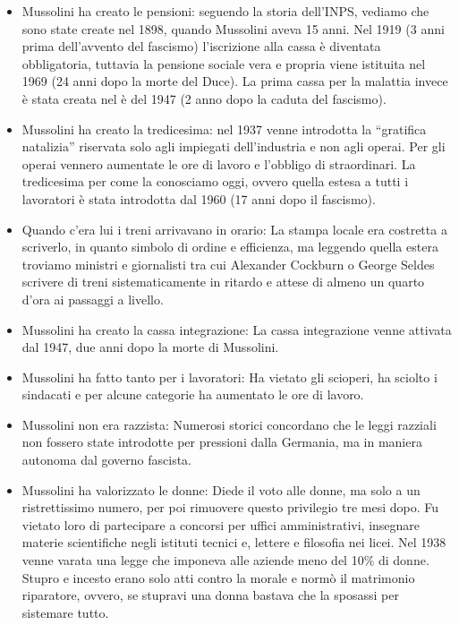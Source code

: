 \documentclass[12pt]{book} %
\begin{document}
\begin{itemize}
\item Mussolini ha creato le pensioni: seguendo la storia dell'INPS, vediamo che sono state create nel 1898, quando Mussolini aveva 15 anni. Nel 1919 (3 anni prima dell'avvento del fascismo) l'iscrizione alla cassa è diventata obbligatoria, tuttavia la pensione sociale vera e propria viene istituita nel 1969 (24 anni dopo la morte del Duce).
La prima cassa per la malattia invece è stata creata nel è del 1947 (2 anno dopo la caduta del fascismo).
\item Mussolini ha creato la tredicesima: nel 1937 venne introdotta la “gratifica natalizia” riservata solo agli impiegati dell'industria e non agli operai. Per gli operai vennero aumentate le ore di lavoro e l'obbligo di straordinari. La tredicesima per come la conosciamo oggi, ovvero quella
estesa a tutti i lavoratori è stata introdotta dal 1960 (17 anni dopo il fascismo).
\item Quando c'era lui i treni arrivavano in orario: La stampa locale era costretta a scriverlo, in quanto simbolo di ordine e efficienza, ma leggendo quella estera troviamo ministri e giornalisti tra cui Alexander Cockburn o George Seldes scrivere di treni sistematicamente in ritardo e attese di almeno un quarto d'ora ai passaggi a livello.
\item Mussolini ha creato la cassa integrazione: La cassa integrazione venne attivata dal 1947, due anni dopo la morte di Mussolini.
\item Mussolini ha fatto tanto per i lavoratori: Ha vietato gli scioperi, ha sciolto i sindacati e per alcune categorie ha aumentato le ore di lavoro.
\item Mussolini non era razzista: Numerosi storici concordano che le leggi razziali non fossero state introdotte per pressioni dalla Germania, ma in maniera autonoma dal governo fascista.
\item Mussolini ha valorizzato le donne: Diede il voto alle donne, ma solo a un ristrettissimo numero, per poi rimuovere questo privilegio tre mesi dopo. Fu vietato loro di partecipare a concorsi per uffici amministrativi, insegnare materie
scientifiche negli istituti tecnici e, lettere e filosofia nei licei. Nel 1938 venne varata una legge che imponeva alle aziende meno del 10\% di donne. Stupro e incesto erano solo atti contro la morale e normò il matrimonio riparatore, ovvero, se stupravi una donna bastava che la sposassi per sistemare tutto.

\end{itemize}
\end{document}
